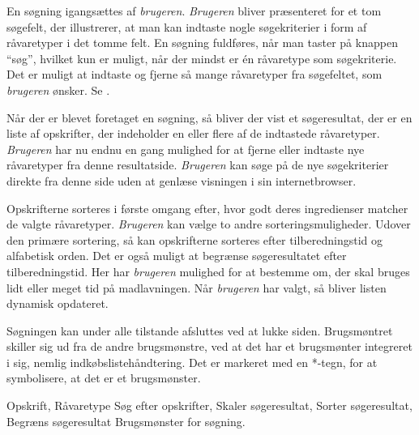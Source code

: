 {En søgning igangsættes af \textit{brugeren}. \textit{Brugeren} bliver præsenteret for et tom søgefelt, der illustrerer, at man kan indtaste nogle søgekriterier i form af råvaretyper i det tomme felt. En søgning fuldføres, når man taster på knappen ``søg'', hvilket kun er muligt, når der mindst er én råvaretype som søgekriterie. Det er muligt at indtaste og fjerne så mange råvaretyper fra søgefeltet, som \textit{brugeren} ønsker. Se .

Når der er blevet foretaget en søgning, så bliver der vist et søgeresultat, der er en liste af opskrifter, der indeholder en eller flere af de indtastede råvaretyper. \textit{Brugeren} har nu endnu en gang mulighed for at fjerne eller indtaste nye råvaretyper fra denne resultatside. \textit{Brugeren} kan søge på de nye søgekriterier direkte fra denne side uden at genlæse visningen i sin internetbrowser.

Opskrifterne sorteres i første omgang efter, hvor godt deres ingredienser matcher de valgte råvaretyper. \textit{Brugeren} kan vælge to andre sorteringsmuligheder. Udover den primære sortering, så kan opskrifterne sorteres efter tilberedningstid og alfabetisk orden. Det er også muligt at begrænse søgeresultatet efter tilberedningstid. Her har \textit{brugeren} mulighed for at bestemme om, der skal bruges lidt eller meget tid på madlavningen. Når \textit{brugeren} har valgt, så bliver listen dynamisk opdateret.

Søgningen kan under alle tilstande afsluttes ved at lukke siden. Brugsmøntret skiller sig ud fra de andre brugsmønstre, ved at det har et brugsmønter integreret i sig, nemlig indkøbslistehåndtering. Det er markeret med en *-tegn, for at symbolisere, at det er et brugsmønster.}
{Opskrift, Råvaretype}
{Søg efter opskrifter, Skaler søgeresultat, Sorter søgeresultat, Begræns søgeresultat}
{Brugsmønster for søgning.}
